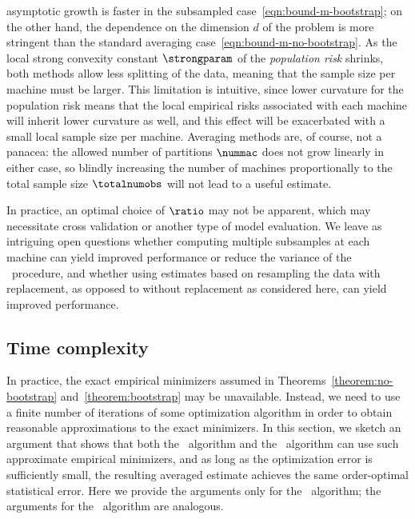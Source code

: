 \documentclass[11pt,twoside]{article}
\theoremstyle{definition}
\begin{document}
asymptotic growth is faster in the subsampled
case~\eqref{eqn:bound-m-bootstrap}; on the other hand, the dependence
on the dimension $d$ of the problem is more stringent than the
standard averaging case~\eqref{eqn:bound-m-no-bootstrap}. As the local
strong convexity constant $\strongparam$ of the \emph{population risk}
shrinks, both methods allow less splitting of the data, meaning that
the sample size per machine must be larger.  This limitation is
intuitive, since lower curvature for the population risk means that
the local empirical risks associated with each machine will inherit
lower curvature as well, and this effect will be exacerbated with a
small local sample size per machine.  Averaging methods are, of
course, not a panacea: the allowed number of partitions $\nummac$ does
not grow linearly in either case, so blindly increasing the number of
machines proportionally to the total sample size $\totalnumobs$ will
not lead to a useful estimate.


In practice, an optimal choice of $\ratio$ may not be apparent, which
may necessitate cross validation or another type of model
evaluation. We leave as intriguing open questions whether computing
multiple subsamples at each machine can yield improved performance or
reduce the variance of the \savgm\ procedure, and whether using
estimates based on resampling the data with replacement, as opposed to
without replacement as considered here, can yield improved
performance.


\subsection{Time complexity}
\label{sec:complexity}

In practice, the exact empirical minimizers assumed in
Theorems~\ref{theorem:no-bootstrap} and~\ref{theorem:bootstrap} may be
unavailable.  Instead, we need to use a finite number of iterations of
some optimization algorithm in order to obtain reasonable
approximations to the exact minimizers.  In this section, we sketch an
argument that shows that both the \avgm\ algorithm and the
\savgm\ algorithm can use such approximate empirical minimizers, and
as long as the optimization error is sufficiently small, the resulting
averaged estimate achieves the same order-optimal statistical error.
Here we provide the arguments only for the \avgm\ algorithm; the
arguments for the \savgm\ algorithm are analogous.
\end{document}
